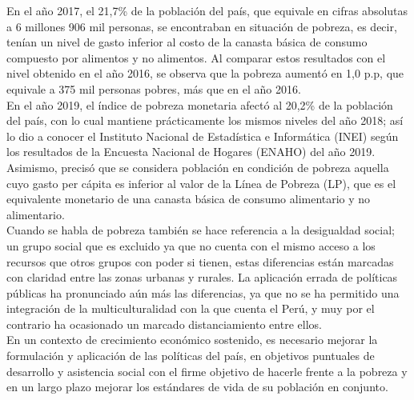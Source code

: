 En el año 2017, el 21,7\% de la población del país, que equivale en cifras absolutas a 6 millones 906 mil personas, se encontraban en situación de pobreza, es decir, tenían un nivel de gasto inferior al costo de la canasta básica de consumo compuesto por alimentos y no alimentos. Al comparar estos resultados con el nivel obtenido en el año 2016, se observa que la pobreza aumentó en 1,0 p.p, que equivale a 375 mil personas pobres, más que en el año 2016. \\






En el año 2019, el índice de pobreza monetaria afectó al 20,2\% de la población del país, con lo cual mantiene prácticamente los mismos niveles del año 2018; así lo dio a conocer el Instituto Nacional de Estadística e Informática (INEI) según los resultados de la Encuesta Nacional de Hogares (ENAHO) del año 2019. Asimismo, precisó que se considera población en condición de pobreza aquella cuyo gasto per cápita es inferior al valor de la Línea de Pobreza (LP), que es el equivalente monetario de una canasta básica de consumo alimentario y no alimentario. \\
Cuando se habla de pobreza también se hace referencia a la desigualdad social; un grupo social que es excluido ya que no cuenta con el mismo acceso a los recursos que otros grupos con poder si tienen, estas diferencias están marcadas con claridad entre las zonas urbanas y rurales. 
La aplicación errada de políticas públicas ha pronunciado aún más las diferencias, ya que no se ha permitido una integración de la multiculturalidad con la que cuenta el Perú, y muy por el contrario ha ocasionado un marcado distanciamiento entre ellos. \\
En un contexto de crecimiento económico sostenido, es necesario mejorar la formulación y aplicación de las políticas del país, en objetivos puntuales de desarrollo y asistencia social con el firme objetivo de hacerle frente a la pobreza y en un largo plazo mejorar los estándares de vida de su población en conjunto.



